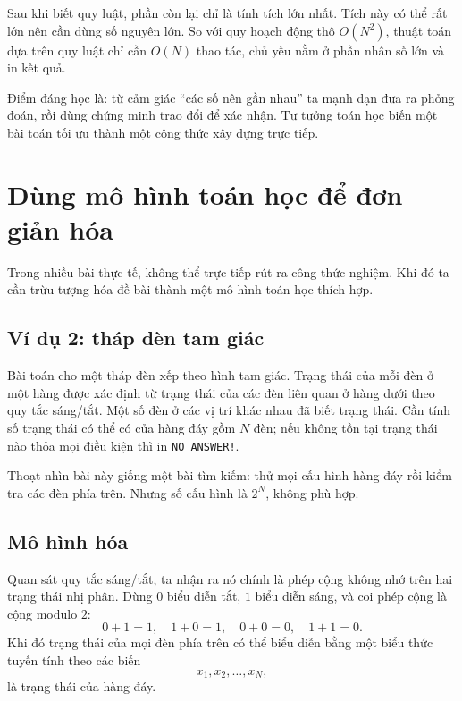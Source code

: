 \documentclass[11pt]{article}
\begin{document}
Sau khi biết quy luật, phần còn lại chỉ là tính tích lớn nhất. Tích này có
thể rất lớn nên cần dùng số nguyên lớn. So với quy hoạch động thô \(O(N^2)\),
thuật toán dựa trên quy luật chỉ cần \(O(N)\) thao tác, chủ yếu nằm ở phần
nhân số lớn và in kết quả.

Điểm đáng học là: từ cảm giác ``các số nên gần nhau'' ta mạnh dạn đưa ra
phỏng đoán, rồi dùng chứng minh trao đổi để xác nhận. Tư tưởng toán học biến
một bài toán tối ưu thành một công thức xây dựng trực tiếp.

\section{Dùng mô hình toán học để đơn giản hóa}

Trong nhiều bài thực tế, không thể trực tiếp rút ra công thức nghiệm. Khi đó
ta cần trừu tượng hóa đề bài thành một mô hình toán học thích hợp.

\subsection{Ví dụ 2: tháp đèn tam giác}

Bài toán cho một tháp đèn xếp theo hình tam giác. Trạng thái của mỗi đèn ở
một hàng được xác định từ trạng thái của các đèn liên quan ở hàng dưới theo
quy tắc sáng/tắt. Một số đèn ở các vị trí khác nhau đã biết trạng thái. Cần
tính số trạng thái có thể có của hàng đáy gồm \(N\) đèn; nếu không tồn tại
trạng thái nào thỏa mọi điều kiện thì in \texttt{NO ANSWER!}.

Thoạt nhìn bài này giống một bài tìm kiếm: thử mọi cấu hình hàng đáy rồi kiểm
tra các đèn phía trên. Nhưng số cấu hình là \(2^N\), không phù hợp.

\subsection{Mô hình hóa}

Quan sát quy tắc sáng/tắt, ta nhận ra nó chính là phép cộng không nhớ trên
hai trạng thái nhị phân. Dùng \(0\) biểu diễn tắt, \(1\) biểu diễn sáng, và
coi phép cộng là cộng modulo \(2\):
\[
  0+1=1,\quad 1+0=1,\quad 0+0=0,\quad 1+1=0.
\]
Khi đó trạng thái của mọi đèn phía trên có thể biểu diễn bằng một biểu thức
tuyến tính theo các biến
\[
  x_1,x_2,\ldots,x_N,
\]
là trạng thái của hàng đáy.
\end{document}
